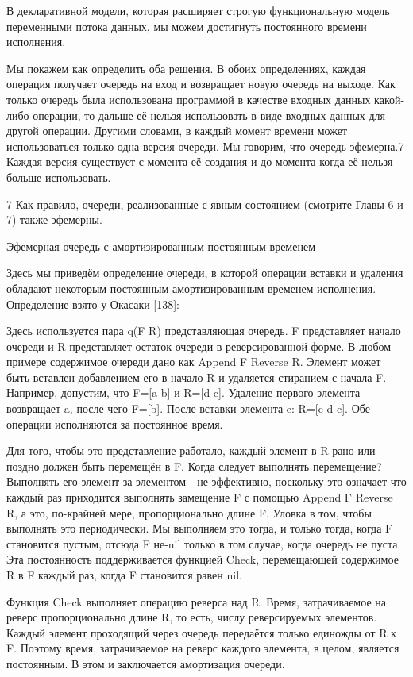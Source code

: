 В декларативной модели, которая расширяет строгую функциональную модель переменными потока данных, мы можем достигнуть постоянного времени исполнения.

Мы покажем как определить оба решения. В обоих определениях, каждая операция получает очередь на вход и возвращает новую очередь на выходе. Как только очередь была использована программой в качестве входных данных какой-либо операции, то дальше её нельзя использовать в виде входных данных для другой операции. Другими словами, в каждый момент времени может использоваться только одна версия очереди. Мы говорим, что очередь эфемерна.7 Каждая версия существует с момента её создания и до момента когда её нельзя больше использовать.

7 Как правило, очереди, реализованные с явным состоянием (смотрите Главы 6 и 7) также эфемерны.

Эфемерная очередь с амортизированным постоянным временем

Здесь мы приведём определение очереди, в которой операции вставки и удаления обладают некоторым постоянным амортизированным временем исполнения. Определение взято у Окасаки [138]:

Здесь используется пара q(F R) представляющая очередь. F представляет начало очереди и R представляет остаток очереди в реверсированной форме. В любом примере содержимое очереди дано как {Append F {Reverse R}}. Элемент может быть вставлен добавлением его в начало R и удаляется стиранием с начала F. Например, допустим, что F=[a b] и R=[d c]. Удаление первого элемента возвращает a, после чего F=[b]. После вставки элемента e: R=[e d c]. Обе операции исполняются за постоянное время.

Для того, чтобы это представление работало, каждый элемент в R рано или поздно должен быть перемещён в F. Когда следует выполнять перемещение? Выполнять его элемент за элементом - не эффективно, поскольку это означает что каждый раз приходится выполнять замещение F с помощью {Append F {Reverse R}}, а это, по-крайней мере, пропорционально длине F. Уловка в том, чтобы выполнять это периодически. Мы выполняем это тогда, и только тогда, когда F становится пустым, отсюда F не-nil только в том случае, когда очередь не пуста. Эта постоянность поддерживается функцией Check, перемещающей содержимое R в F каждый раз, когда F становится равен nil.

Функция Check выполняет операцию реверса над R. Время, затрачиваемое на реверс пропорционально длине R, то есть, числу реверсируемых элементов. Каждый элемент проходящий через очередь передаётся только единожды от R к F. Поэтому время, затрачиваемое на реверс каждого элемента, в целом, является постоянным. В этом и заключается амортизация очереди.

